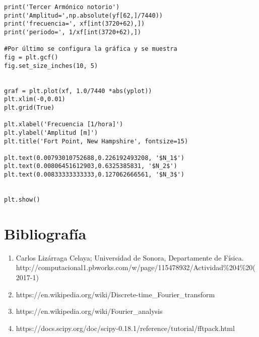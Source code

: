 \documentclass[12pt,a4paper]{article}
\begin{document}
\begin{verbatim}
print('Tercer Armónico notorio')
print('Amplitud=',np.absolute(yf[62,]/7440))
print('frecuencia=', xf[int(3720+62),])
print('periodo=', 1/xf[int(3720+62),])

#Por último se configura la gráfica y se muestra
fig = plt.gcf()
fig.set_size_inches(10, 5)


graf = plt.plot(xf, 1.0/7440 *abs(yplot))
plt.xlim(-0,0.01)
plt.grid(True)

plt.xlabel('Frecuencia [1/hora]')
plt.ylabel('Amplitud [m]')
plt.title('Fort Point, New Hampshire', fontsize=15)

plt.text(0.00793010752688,0.226192493208, '$N_1$')
plt.text(0.00806451612903,0.6325385831, '$N_2$')
plt.text(0.00833333333333,0.127062666561, '$N_3$')


plt.show()
\end{verbatim}

\section{Bibliografía}

\begin{enumerate}

\item  Carlos Lizárraga Celaya; Universidad de Sonora, Departamente de Física. \\ http://computacional1.pbworks.com/w/page/115478932/Actividad\%204\%20(2017-1)

\item https://en.wikipedia.org/wiki/Discrete-time\_Fourier\_transform

\item https://en.wikipedia.org/wiki/Fourier\_analysis

\item https://docs.scipy.org/doc/scipy-0.18.1/reference/tutorial/fftpack.html

\end{enumerate}
\end{document}
